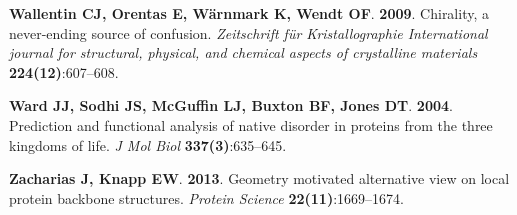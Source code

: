 \documentclass[fleqn,10pt,lineno]{wlpeerj} %
\begin{document}
\begin{thebibliography}{58}
\textbf{Wallentin CJ, Orentas E, W{\"a}rnmark K, Wendt OF}. \textbf{2009}.
\newblock Chirality, a never-ending source of confusion.
\newblock \emph{Zeitschrift f{\"u}r Kristallographie International journal for
  structural, physical, and chemical aspects of crystalline materials}
  \textbf{224(12)}:607--608.

\textbf{Ward JJ, Sodhi JS, McGuffin LJ, Buxton BF, Jones DT}. \textbf{2004}.
\newblock Prediction and functional analysis of native disorder in proteins
  from the three kingdoms of life.
\newblock \emph{J Mol Biol} \textbf{337(3)}:635--645.

\textbf{Zacharias J, Knapp EW}. \textbf{2013}.
\newblock Geometry motivated alternative view on local protein backbone
  structures.
\newblock \emph{Protein Science} \textbf{22(11)}:1669--1674.

\end{thebibliography}
\end{document}
